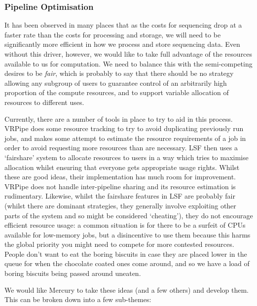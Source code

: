 \documentclass[10pt,a4paper]{article}
\newcommand{\npar}{\par\noindent\space}
\begin{document}
\subsubsection{Pipeline Optimisation}
\label{sec:optimisation}
\npar It has been observed in many places that as the costs for sequencing drop at a faster rate than the costs for processing and storage, we will need to be significantly more efficient in how we process and store sequencing data. Even without this driver, however, we would like to take full advantage of the resources available to us for computation. We need to balance this with the semi-competing desires to be \textit{fair}, which is probably to say that there should be no strategy allowing any subgroup of users to guarantee control of an arbitrarily high proportion of the compute resources, and to support variable allocation of resources to different uses.
\npar Currently, there are a number of tools in place to try to aid in this process. VRPipe does some resource tracking to try to avoid duplicating previously run jobs, and makes some attempt to estimate the resource requirements of a job in order to avoid requesting more resources than are necessary. LSF then uses a `fairshare' system to allocate resources to users in a way which tries to maximise allocation whilst ensuring that everyone gets appropriate usage rights. Whilst these are good ideas, their implementation has much room for improvement. VRPipe does not handle inter-pipeline sharing and its resource estimation is rudimentary. Likewise, whilst the fairshare features in LSF are probably fair (whilst there are dominant strategies, they generally involve exploiting other parts of the system and so might be considered `cheating'), they do not encourage efficient resource usage: a common situation is for there to be a surfeit of CPUs available for low-memory jobs, but a disincentive to use them because this harms the global priority you might need to compete for more contested resources. People don't want to eat the boring biscuits in case they are placed lower in the queue for when the chocolate coated ones come around, and so we have a load of boring biscuits being passed around uneaten.
\npar We would like Mercury to take these ideas (and a few others) and develop them. This can be broken down into a few sub-themes:
\end{document}
